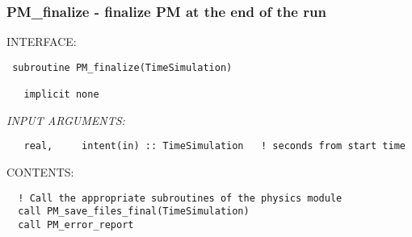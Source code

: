 \subsubsection{ PM\_finalize - finalize PM at the end of the run }


\bigskip
{\sf INTERFACE:}
\begin{verbatim} subroutine PM_finalize(TimeSimulation)
 
   implicit none
 \end{verbatim}
{\em INPUT ARGUMENTS:}
\begin{verbatim}   real,     intent(in) :: TimeSimulation   ! seconds from start time\end{verbatim}



\bigskip
{\sf CONTENTS:}
\begin{verbatim}
  ! Call the appropriate subroutines of the physics module
  call PM_save_files_final(TimeSimulation)
  call PM_error_report
 
\end{verbatim}

